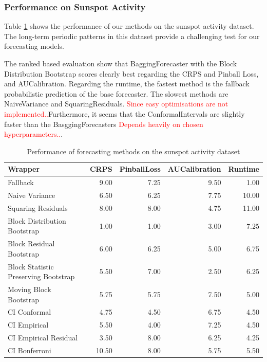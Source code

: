 \subsubsection{Performance on Sunspot Activity}
Table \ref{table:sunspot_results} shows the performance of our methods on the sunspot activity dataset. The long-term periodic patterns in this dataset provide a challenging test for our forecasting models.

The ranked based evaluation show that BaggingForecaster with the Block Distribution Bootstrap scores clearly best regarding the CRPS and Pinball Loss, and AUCalibration. Regarding the runtime, the fastest method is the fallback probabilistic prediction of the base forecaster. The slowest methods are NaiveVariance and SquaringResiduals. 
\textcolor{red}{Since easy optimisations are not implemented..}Furthermore, it seems that the ConformalIntervals are slightly faster than the BasggingForecasters \textcolor{red}{Depends heavily on chosen hyperparameters..}. 
\begin{table}[h]
    \centering
    \caption{Performance of forecasting methods on the sunspot activity dataset}
    \label{table:sunspot_results}
\begin{tabular}{lrrrr}
\toprule
Wrapper & CRPS & PinballLoss & AUCalibration & Runtime \\
\midrule
Fallback & 9.00 & 7.25 & 9.50 & 1.00 \\
Naive Variance & 6.50 & 6.25 & 7.75 & 10.00 \\
Squaring Residuals & 8.00 & 8.00 & 4.75 & 11.00 \\
Block Distribution Bootstrap & 1.00 & 1.00 & 3.00 & 7.25 \\
Block Residual Bootstrap & 6.00 & 6.25 & 5.00 & 6.75 \\
Block Statistic Preserving Bootstrap & 5.50 & 7.00 & 2.50 & 6.25 \\
Moving Block Bootstrap & 5.75 & 5.75 & 7.50 & 5.00 \\
CI Conformal & 4.75 & 4.50 & 6.75 & 4.50 \\
CI Empirical & 5.50 & 4.00 & 7.25 & 4.50 \\
CI Empirical Residual & 3.50 & 8.00 & 6.25 & 4.25 \\
CI Bonferroni  & 10.50 & 8.00 & 5.75 & 5.50 \\
\bottomrule
\end{tabular}


\end{table}

